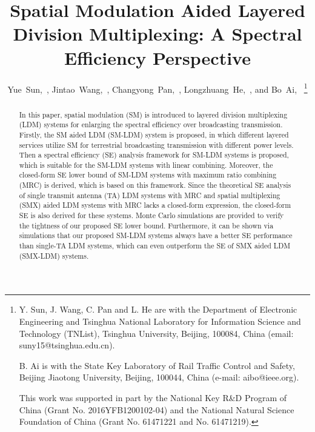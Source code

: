 \documentclass[journal]{IEEEtran}
\begin{document}
%
\title{Spatial Modulation Aided Layered Division Multiplexing: A Spectral Efficiency Perspective}
%


\author{Yue~Sun,~,
        Jintao~Wang,~,
        Changyong~Pan,~,
        Longzhuang~He,~,
        and Bo~Ai,~
\thanks{
Y. Sun, J. Wang, C. Pan and L. He are with the Department of Electronic Engineering and Tsinghua National Laboratory for Information Science and Technology (TNList), Tsinghua University, Beijing, 100084, China (email: suny15@tsinghua.edu.cn).

B. Ai is with the State Key Laboratory of Rail Traffic Control and Safety, Beijing Jiaotong University, Beijing, 100044, China (e-mail: aibo@ieee.org).

This work was supported in part by the National Key R\&D Program of China (Grant No. 2016YFB1200102-04) and the National Natural Science Foundation of China (Grant No. 61471221 and No. 61471219).
}}

\maketitle


\begin{abstract}
In this paper, spatial modulation (SM) is introduced to layered division multiplexing (LDM) systems for enlarging the spectral efficiency over broadcasting transmission. Firstly, the SM aided LDM (SM-LDM) system is proposed, in which different layered services utilize SM for terrestrial broadcasting transmission with different power levels. Then a spectral efficiency (SE) analysis framework for SM-LDM systems is proposed, which is suitable for the SM-LDM systems with linear combining. Moreover, the closed-form SE lower bound of SM-LDM systems with maximum ratio combining (MRC) is derived, which is based on this framework. Since the theoretical SE analysis of single transmit antenna (TA) LDM systems with MRC and spatial multiplexing (SMX) aided LDM systems with MRC lacks a closed-form expression, the closed-form SE is also derived for these systems. Monte Carlo simulations are provided to verify the tightness of our proposed SE lower bound. Furthermore, it can be shown via simulations that our proposed SM-LDM systems always have a better SE performance than single-TA LDM systems, which can even outperform the SE of SMX aided LDM (SMX-LDM) systems.
\end{abstract}
\end{document}
